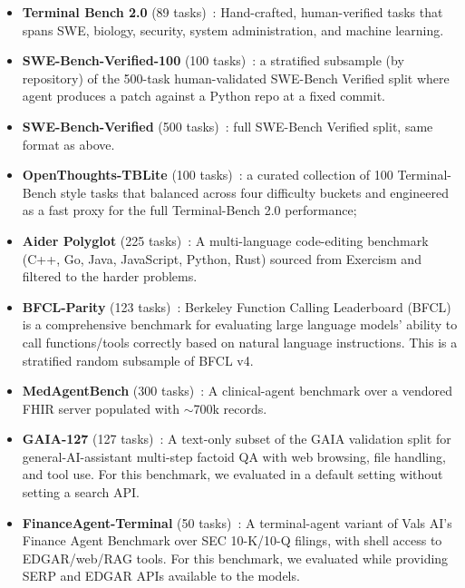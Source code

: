 \documentclass{llmxive}
\begin{document}
\begin{itemize}
  \item \textbf{Terminal Bench 2.0} (89 tasks)~\citep{merrill2026terminalbenchbenchmarkingagentshard}:
        Hand-crafted, human-verified tasks that spans SWE, biology, security, system administration, and machine learning.
        
  \item \textbf{SWE-Bench-Verified-100} (100 tasks)~\citep{jimenez2024swebenchlanguagemodelsresolve}:
        a stratified subsample (by repository) of the 500-task human-validated SWE-Bench Verified
        split where agent produces a patch against a Python repo at a fixed commit.

  \item \textbf{SWE-Bench-Verified} (500 tasks)~\citep{jimenez2024swebenchlanguagemodelsresolve}:
        full SWE-Bench Verified split, same format as above.

  \item \textbf{OpenThoughts-TBLite} (100 tasks)~\citep{OpenThoughts-TBLite}:
        a curated collection of 100 Terminal-Bench style tasks that balanced across four
        difficulty buckets and engineered as a fast proxy for the full Terminal-Bench 2.0 performance;

  \item \textbf{Aider Polyglot} (225 tasks)~\citep{aiderpolyglot2024}:
        A multi-language code-editing benchmark (C++, Go, Java, JavaScript,
        Python, Rust) sourced from Exercism and filtered to the harder
        problems.

  \item \textbf{BFCL-Parity} (123 tasks)~\citep{patil2025bfcl}:
        Berkeley Function Calling Leaderboard (BFCL) is a comprehensive benchmark for evaluating large language models' ability to call functions/tools correctly based on natural language instructions. This is a stratified random subsample of BFCL v4.

  \item \textbf{MedAgentBench} (300 tasks)~\citep{jiang2025medagentbench}:
        A clinical-agent benchmark over a vendored FHIR server populated
        with $\sim$700k records.

  \item \textbf{GAIA-127} (127 tasks)~\citep{mialon2023gaia}:
        A text-only subset of the GAIA validation split for general-AI-assistant
        multi-step factoid QA with web browsing, file handling, and tool
        use. For this benchmark, we evaluated in a default setting without setting a search API.

  \item \textbf{FinanceAgent-Terminal} (50 tasks)~\citep{valsai2024financeagent}:
        A terminal-agent variant of Vals AI's Finance Agent Benchmark
        over SEC 10-K/10-Q filings, with shell access to EDGAR/web/RAG
        tools. For this benchmark, we evaluated while providing SERP and EDGAR APIs available to the models.
\end{itemize}
\end{document}
